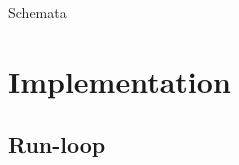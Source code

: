 \documentclass[ 
xcolor={usenames,dvipsnames,svgnames,tablem} 
,handout
]{beamer}
\begin{document}
\frame{
	\begin{block}{}
		\vspace{-1.5em}
	
	\end{block}
	\vspace{1em}
	\begin{block}{Equality as predicate}
		\vspace{-1.2em}
		
		
	}
\begin{frame}
	
	\begin{block}{}
		\vspace{-1.5em}
		
	\end{block}
	
	\begin{block}{Schemata}
		\vspace{-1em}
		
	\end{block}
\end{frame}

\begin{frame}
	
	
	
	\end{frame}







\section{Implementation}
\subsection{Run-loop}




\end{document}
